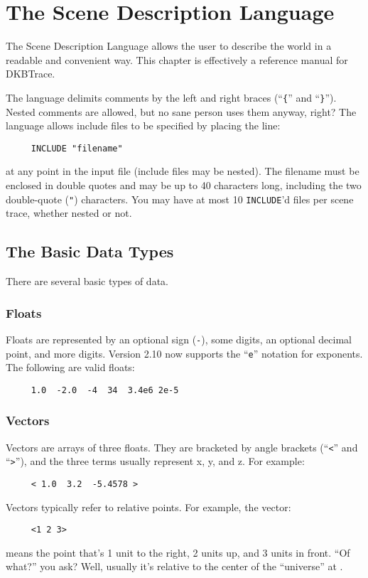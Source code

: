 \chapter{The Scene Description Language}

The Scene Description Language allows the user to describe the world in a
readable and convenient way. This chapter is effectively a reference
manual for DKBTrace.

The language delimits comments by the left and right
braces (``{\tt \{}'' and ``{\tt \}}''). Nested comments are allowed,
but no sane person uses them anyway, right?
The language allows include files to be specified by placing the line:
\begin{verbatim}
     INCLUDE "filename"
\end{verbatim}
at any point in the input file (include files may be nested).  The filename
must be enclosed in double quotes and may be up to 40 characters long,
including the two double-quote ({\tt "}) characters.  You may have at most 10
{\tt INCLUDE}'d files per scene trace, whether nested or not.

\section{The Basic Data Types}

There are several basic types of data.

\subsection{Floats}

Floats are represented by an optional sign ({\tt -}), some digits, an optional
decimal point, and more digits.  Version 2.10 now supports the
``{\tt e}'' notation for exponents.  The following are valid floats:
\begin{verbatim}
     1.0  -2.0  -4  34  3.4e6 2e-5
\end{verbatim}

\subsection{Vectors}

Vectors are arrays of three floats.  They are bracketed by angle brackets
(``{\tt <}'' and ``{\tt >}''), and the three terms usually represent x, y,
and z. For example:
\begin{verbatim}
     < 1.0  3.2  -5.4578 >
\end{verbatim}
Vectors typically refer to relative points.  For example, the vector:
\begin{verbatim}
     <1 2 3>
\end{verbatim}
means the point that's 1 unit to the right, 2 units up, and 3 units in front.
``Of what?'' you ask?  Well, usually it's relative to the center of the
``universe'' at {\tt <0 0 0>}.

